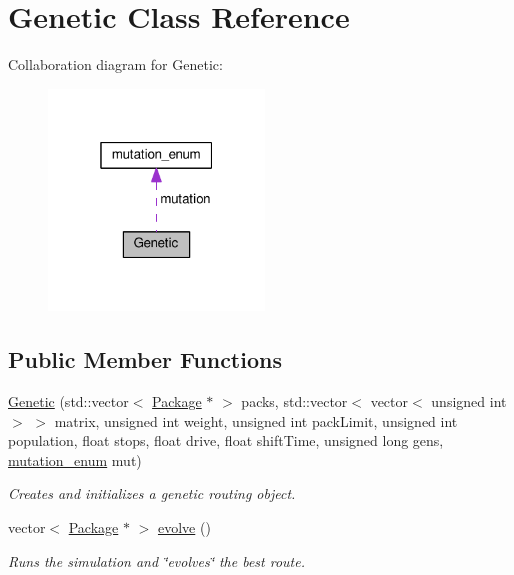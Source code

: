 \hypertarget{classGenetic}{}\section{Genetic Class Reference}
\label{classGenetic}


Collaboration diagram for Genetic\+:\nopagebreak
\begin{figure}[H]
\begin{center}
\leavevmode
\includegraphics[width=163pt]{classGenetic__coll__graph}
\end{center}
\end{figure}
\subsection*{Public Member Functions}
\begin{DoxyCompactItemize}
\item 
\hyperlink{classGenetic_a7e021c123aa8d145e7b1512b19a38d34}{Genetic} (std\+::vector$<$ \hyperlink{classPackage}{Package} $\ast$ $>$ packs, std\+::vector$<$ vector$<$ unsigned int $>$ $>$ matrix, unsigned int weight, unsigned int pack\+Limit, unsigned int population, float stops, float drive, float shift\+Time, unsigned long gens, \hyperlink{structmutation__enum}{mutation\+\_\+enum} mut)\hypertarget{classGenetic_a7e021c123aa8d145e7b1512b19a38d34}{}\label{classGenetic_a7e021c123aa8d145e7b1512b19a38d34}

\begin{DoxyCompactList}\small\item\em Creates and initializes a genetic routing object. \end{DoxyCompactList}\item 
vector$<$ \hyperlink{classPackage}{Package} $\ast$ $>$ \hyperlink{classGenetic_a07f19b04d7f0d746da8a7e7747eeef4a}{evolve} ()
\begin{DoxyCompactList}\small\item\em Runs the simulation and \char`\"{}evolves\char`\"{} the best route. \end{DoxyCompactList}\end{DoxyCompactItemize}
